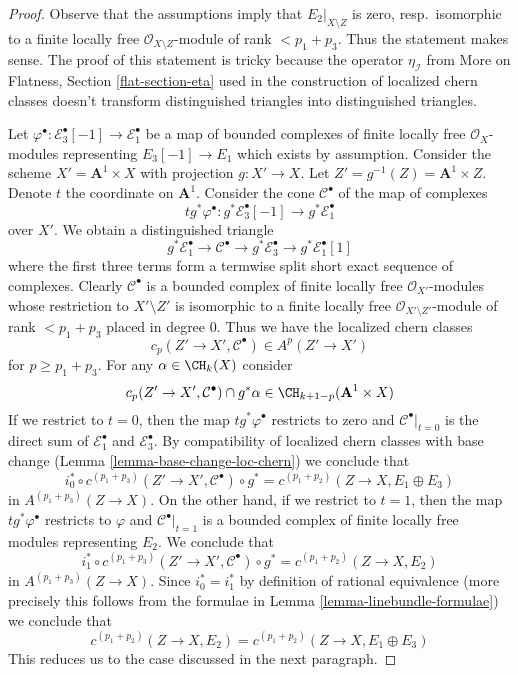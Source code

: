 \begin{proof}
Observe that the assumptions imply that $E_2|_{X \setminus Z}$ is zero,
resp.\ isomorphic to a finite locally free $\mathcal{O}_{X \setminus Z}$-module
of rank $< p_1 + p_3$. Thus the statement makes sense. The proof of this
statement is tricky because the operator $\eta_\mathcal{I}$ from
More on Flatness, Section \ref{flat-section-eta} used in the construction
of localized chern classes doesn't transform distinguished triangles into
distinguished triangles.

\medskip\noindent
Let $\varphi^\bullet : \mathcal{E}_3^\bullet[-1] \to \mathcal{E}_1^\bullet$
be a map of bounded complexes of finite locally free $\mathcal{O}_X$-modules
representing $E_3[-1] \to E_1$ which exists by assumption. Consider the scheme
$X' = \mathbf{A}^1 \times X$ with projection
$g : X' \to X$. Let $Z' = g^{-1}(Z) = \mathbf{A}^1 \times Z$.
Denote $t$ the coordinate on $\mathbf{A}^1$. Consider the cone
$\mathcal{C}^\bullet$ of the map of complexes
$$
t g^*\varphi^\bullet :
g^*\mathcal{E}_3^\bullet[-1]
\longrightarrow
g^*\mathcal{E}_1^\bullet
$$
over $X'$. We obtain a distinguished triangle
$$
g^*\mathcal{E}_1^\bullet \to \mathcal{C}^\bullet \to
g^*\mathcal{E}_3^\bullet \to g^*\mathcal{E}_1^\bullet[1]
$$
where the first three terms form a termwise split short exact
sequence of complexes. Clearly $\mathcal{C}^\bullet$ is a
bounded complex of finite locally free $\mathcal{O}_{X'}$-modules
whose restriction to $X' \setminus Z'$ is isomorphic to a
finite locally free
$\mathcal{O}_{X' \setminus Z'}$-module of rank $< p_1 + p_3$
placed in degree $0$. Thus we have the localized chern classes
$$
c_p(Z' \to X', \mathcal{C}^\bullet) \in A^p(Z' \to X')
$$
for $p \geq p_1 + p_3$. For any $\alpha \in \CH_k(X)$ consider
$$
c_p(Z' \to X', \mathcal{C}^\bullet) \cap g^*\alpha
\in \CH_{k + 1 - p}(\mathbf{A}^1 \times X)
$$
If we restrict to $t = 0$, then the map $t g^*\varphi^\bullet$
restricts to zero and $\mathcal{C}^\bullet|_{t = 0}$
is the direct sum of $\mathcal{E}_1^\bullet$ and $\mathcal{E}_3^\bullet$.
By compatibility of localized chern classes with base change
(Lemma \ref{lemma-base-change-loc-chern}) we conclude that
$$
i_0^* \circ c^{(p_1 + p_3)}(Z' \to X', \mathcal{C}^\bullet) \circ g^* =
c^{(p_1 + p_2)}(Z \to X, E_1 \oplus E_3)
$$
in $A^{(p_1 + p_3)}(Z \to X)$. On the other hand, if we restrict to $t = 1$,
then the map $t g^*\varphi^\bullet$
restricts to $\varphi$ and $\mathcal{C}^\bullet|_{t = 1}$
is a bounded complex of finite locally free modules representing $E_2$.
We conclude that
$$
i_1^* \circ c^{(p_1 + p_3)}(Z' \to X', \mathcal{C}^\bullet) \circ g^* =
c^{(p_1 + p_2)}(Z \to X, E_2)
$$
in $A^{(p_1 + p_3)}(Z \to X)$. Since $i_0^* = i_1^*$ by definition of
rational equivalence (more precisely this follows from the formulae in
Lemma \ref{lemma-linebundle-formulae}) we conclude that
$$
c^{(p_1 + p_2)}(Z \to X, E_2) = c^{(p_1 + p_2)}(Z \to X, E_1 \oplus E_3)
$$
This reduces us to the case discussed in the next paragraph.


\end{proof}
